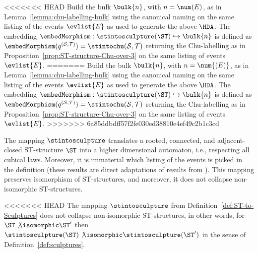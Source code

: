 \begin{definition}
<<<<<<< HEAD
        Build the bulk $\bulk{n}$, with $n=\num(E)$, as in Lemma~\ref{lemma:chu-labelling-bulk} using the canonical naming on the same listing of the events $\evlist{E}$ as used to generate the above $\HDA$.  The embedding $\embedMorphism:\stintosculpture(\ST)\hookrightarrow \bulk{n}$ is defined as $\embedMorphism(q^{(\mathcal{S},\mathcal{T})})=\stintochu(\mathcal{S},\mathcal{T})$ returning the Chu-labelling as in Proposition~\ref{prop:ST-structure-Chu-over-3} on the same listing of events $\evlist{E}$.
=======
        Build the bulk $\bulk{n}$, with $n=\num{(E)}$, as in Lemma~\ref{lemma:chu-labelling-bulk} using the canonical naming on the same listing of the events $\evlist{E}$ as used to generate the above $\HDA$.  The embedding $\embedMorphism:\stintosculpture(\ST)\hookrightarrow \bulk{n}$ is defined as $\embedMorphism(q^{(\mathcal{S},\mathcal{T})})=\stintochu(\mathcal{S},\mathcal{T})$ returning the Chu-labelling as in Proposition~\ref{prop:ST-structure-Chu-over-3} on the same listing of events $\evlist{E}$.
>>>>>>> 6a85ddbdff57f2fe030ed38810e4ef49c2b1c3cd
    \end{definition}
    
    The mapping $\stintosculpture$ translates a rooted, connected, and adjacent-closed ST-structure $\ST$ into a higher dimensional automaton, i.e., respecting all cubical laws. Moreover, it is immaterial which listing of the events is picked in the definition (these results are direct adaptations of results from \cite{Johansen16STstruct}). This mapping preserves isomorphism of ST-structures, and moreover, it does not collapse non-isomorphic ST-structures.

    \begin{proposition}
        \label{prop:ST-to-Sculpture}
<<<<<<< HEAD
        The mapping $\stintosculpture$ from Definition~\ref{def:ST-to-Sculptures} does not collapse non-isomorphic ST-structures, in other words, for $\ST\not\isomorphic\ST'$ then $\stintosculpture(\ST)\not\isomorphic\stintosculpture(\ST')$ in the sense of Definition~\ref{def:sculptures}.
    \end{proposition}

